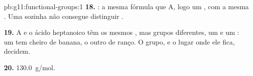 \begin{solution}{pb:g11:functional-groups:1}
\textbf{18.} : a mesma fórmula que A, logo um , com a
mesma . Uma  sozinha não consegue distinguir
.

\textbf{19.} A e o ácido heptanoico têm os mesmos , mas grupos
diferentes, um  e um : um tem cheiro de banana, o
outro de ranço. O grupo, e o lugar onde ele fica, decidem.

\textbf{20.} \qty{130.0}{g/mol}.
\end{solution}
